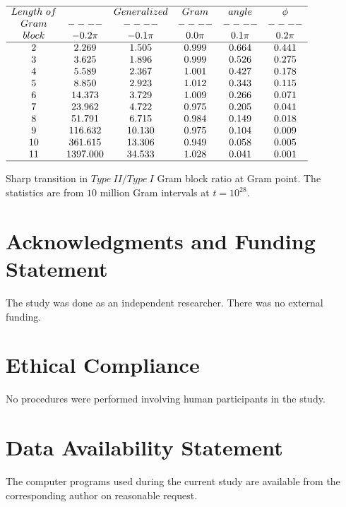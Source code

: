 \documentclass[twoside]{article}
\begin{document}
\begin{table}
\centering \(\begin{array}{cccccc}
\hline
Length~of  && Generalized &Gram&angle &\phi \\
Gram     &----&----&----&----&----\\
block  & -0.2\pi & -0.1\pi & 0.0\pi & 0.1\pi & 0.2\pi  \\
\hline
2 &2.269 &1.505 &0.999 &0.664 &0.441 \\
3 &3.625 &1.896 &0.999 &0.526 &0.275 \\
4 &5.589 &2.367 &1.001 &0.427 &0.178 \\
5 &8.850 &2.923 &1.012 &0.343 &0.115 \\
6 &14.373 &3.729 &1.009 &0.266 &0.071 \\
7 &23.962 &4.722 &0.975 &0.205 &0.041 \\
8 &51.791 &6.715 &0.984 &0.149 &0.018 \\
9 &116.632 &10.130 &0.975 &0.104 &0.009 \\
10 &361.615 &13.306 &0.949 &0.058 &0.005 \\
11 &1397.000 &34.533 &1.028 &0.041 &0.001 \\
\hline
\end{array}\)
\caption{Sharp transition in $Type~II/Type~I$ Gram block ratio at Gram point.
The statistics are from $10$ million Gram intervals at $t=10^{28}$.}
\label{tab:ratioE28}
\end{table}


\section*{Acknowledgments and Funding Statement}

 The study was done as an independent researcher. There was no
external funding.

\section*{Ethical Compliance}

 No procedures were performed  involving human participants in the study.

\section*{Data Availability Statement}

The computer programs used during the current study are
available from the corresponding author on reasonable request.
\end{document}
